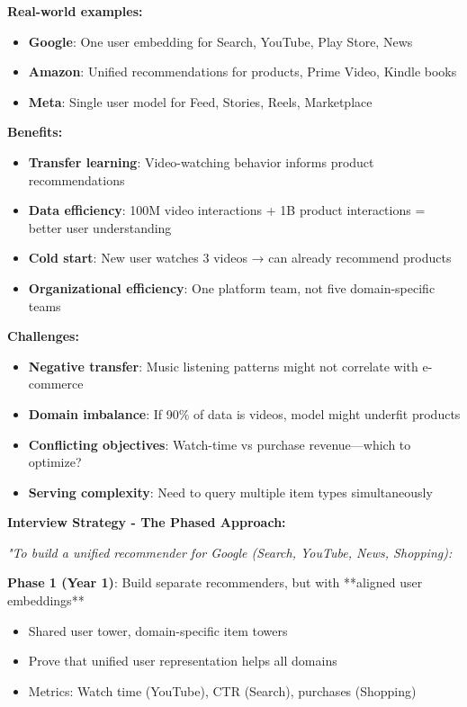 \documentclass[10pt]{article}
\begin{document}
\textbf{Real-world examples:}
\begin{itemize}
\item \textbf{Google}: One user embedding for Search, YouTube, Play Store, News
\item \textbf{Amazon}: Unified recommendations for products, Prime Video, Kindle books
\item \textbf{Meta}: Single user model for Feed, Stories, Reels, Marketplace
\end{itemize}

\textbf{Benefits:}
\begin{itemize}
\item \textbf{Transfer learning}: Video-watching behavior informs product recommendations
\item \textbf{Data efficiency}: 100M video interactions + 1B product interactions = better user understanding
\item \textbf{Cold start}: New user watches 3 videos → can already recommend products
\item \textbf{Organizational efficiency}: One platform team, not five domain-specific teams
\end{itemize}

\textbf{Challenges:}
\begin{itemize}
\item \textbf{Negative transfer}: Music listening patterns might not correlate with e-commerce
\item \textbf{Domain imbalance}: If 90\% of data is videos, model might underfit products
\item \textbf{Conflicting objectives}: Watch-time vs purchase revenue—which to optimize?
\item \textbf{Serving complexity}: Need to query multiple item types simultaneously
\end{itemize}

\textbf{Interview Strategy - The Phased Approach:}

\textit{"To build a unified recommender for Google (Search, YouTube, News, Shopping):}

\textbf{Phase 1 (Year 1)}: Build separate recommenders, but with **aligned user embeddings**
\begin{itemize}
\item Shared user tower, domain-specific item towers
\item Prove that unified user representation helps all domains
\item Metrics: Watch time (YouTube), CTR (Search), purchases (Shopping)
\end{itemize}
\end{document}
